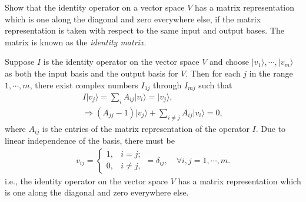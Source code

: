 \documentclass[en]{sol-man}
\begin{document}
\begin{exe}
    Show that the identity operator on a vector space $V$ has a matrix representation which is one along the diagonal and zero everywhere else, if the matrix representation is taken with respect to the same input and output bases. The matrix is known as the \emph{identity matrix}.
\end{exe}
\begin{pf}
    Suppose $I$ is the identity operator on the vector space $V$ and choose $\lvert v_1\rangle,\cdots,\lvert v_m\rangle$ as both the input basis and the output basis for $V$. Then for each $j$ in the range $1,\cdots,m$, there exist complex numbers $I_{1j}$ through $I_{mj}$ such that
    \begin{gather}
        I\lvert v_j\rangle=\sum_iA_{ij}\lvert v_i\rangle=\lvert v_j\rangle,\\
        \Longrightarrow(A_{jj}-1)\lvert v_j\rangle+\sum_{i\neq j}A_{ij}\lvert v_i\rangle=0,
    \end{gather}
    where $A_{ij}$ is the entries of the matrix representation of the operator $I$. Due to linear independence of the basis, there must be
    \begin{align}
        v_{ij}=\left\{\begin{array}{ll}
            1,&i=j;\\
            0,&i\neq j,
        \end{array}\right.=\delta_{ij},\quad\forall i,j=1,\cdots,m.
    \end{align}
    i.e., the identity operator on the vector space $V$ has a matrix representation which is one along the diagonal and zero everywhere else.
\end{pf}
\end{document}
